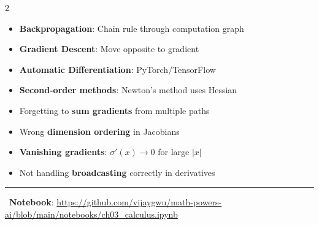 \documentclass[11pt,letterpaper]{article}
\begin{document}
\begin{multicols}{2}
\begin{center}
\end{center}

\begin{tcolorbox}[appbox, title={\faRobot\ ML Applications}]
\begin{itemize}
    \item \textbf{Backpropagation}: Chain rule through computation graph
    \item \textbf{Gradient Descent}: Move opposite to gradient
    \item \textbf{Automatic Differentiation}: PyTorch/TensorFlow
    \item \textbf{Second-order methods}: Newton's method uses Hessian
\end{itemize}
\end{tcolorbox}

\begin{tcolorbox}[warningbox, title={\faExclamationTriangle\ Common Pitfalls}]
\begin{itemize}
    \item Forgetting to \textbf{sum gradients} from multiple paths
    \item Wrong \textbf{dimension ordering} in Jacobians
    \item \textbf{Vanishing gradients}: $\sigma'(x) \to 0$ for large $|x|$
    \item Not handling \textbf{broadcasting} correctly in derivatives
\end{itemize}
\end{tcolorbox}

\end{multicols}

\vspace{5pt}
\hrule
\vspace{5pt}

\begin{center}
\faGithub\ \textbf{Notebook}: \url{https://github.com/vijaygwu/math-powers-ai/blob/main/notebooks/ch03_calculus.ipynb}
\end{center}
\end{document}
